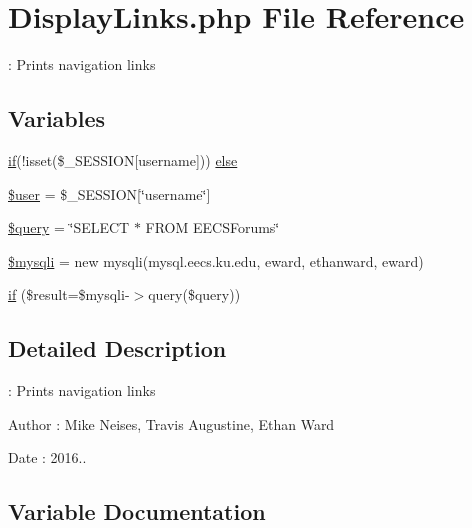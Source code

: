 \hypertarget{_display_links_8php}{}\section{Display\+Links.\+php File Reference}
\label{_display_links_8php}


\+: Prints navigation links  


\subsection*{Variables}
\begin{DoxyCompactItemize}
\item 
\hyperlink{_display_links_8php_aba19ca87a8222f9588fd377feafe258e}{if}(!isset(\$\+\_\+\+S\+E\+S\+S\+I\+ON\mbox{[}\textquotesingle{}username\textquotesingle{}\mbox{]})) \hyperlink{_display_links_8php_a8691f3cba8478e398368302e5f0cb89b}{else}
\item 
\hyperlink{_display_links_8php_a598ca4e71b15a1313ec95f0df1027ca5}{\$user} = \$\+\_\+\+S\+E\+S\+S\+I\+ON\mbox{[}\char`\"{}username\char`\"{}\mbox{]}
\item 
\hyperlink{_display_links_8php_af59a5f7cd609e592c41dc3643efd3c98}{\$query} = \char`\"{}S\+E\+L\+E\+CT $\ast$ F\+R\+OM E\+E\+C\+S\+Forums\char`\"{}
\item 
\hyperlink{_display_links_8php_a580989e8e3521433691a0351287f6315}{\$mysqli} = new mysqli(\textquotesingle{}mysql.\+eecs.\+ku.\+edu\textquotesingle{}, \textquotesingle{}eward\textquotesingle{}, \textquotesingle{}ethanward\textquotesingle{}, \textquotesingle{}eward\textquotesingle{})
\item 
\hyperlink{_display_links_8php_aba19ca87a8222f9588fd377feafe258e}{if} (\$result=\$mysqli-\/$>$query(\$query))
\end{DoxyCompactItemize}


\subsection{Detailed Description}
\+: Prints navigation links 

\begin{DoxyAuthor}{Author}
\+: Mike Neises, Travis Augustine, Ethan Ward 
\end{DoxyAuthor}
\begin{DoxyDate}{Date}
\+: 2016.. 
\end{DoxyDate}


\subsection{Variable Documentation}
